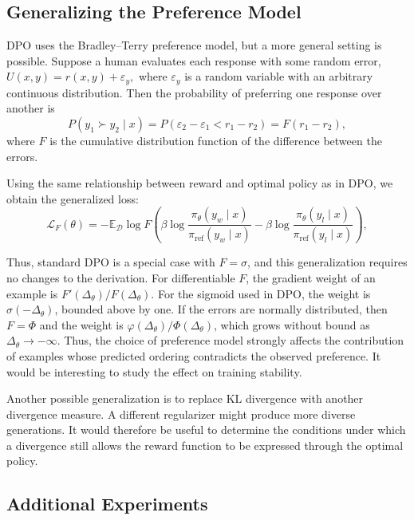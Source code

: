 \documentclass[11pt,a4paper]{article}
\theoremstyle{remark}
\begin{document}
\subsection{Generalizing the Preference Model}

DPO uses the Bradley--Terry preference model, but a more general setting is possible. Suppose a human evaluates each response with some random error, $U(x,y)=r(x,y)+\varepsilon_y,$
where \(\varepsilon_y\) is a random variable with an arbitrary continuous distribution.
Then the probability of preferring one response over another is
\[
P(y_1\succ y_2\mid x)
=P(\varepsilon_2-\varepsilon_1<r_1-r_2)
=F(r_1-r_2),
\]
where \(F\) is the cumulative distribution function of the difference between the errors.

Using the same relationship between reward and optimal policy as in DPO, we obtain the generalized loss:
\[
\mathcal L_F(\theta)
=-\mathbb E_{\mathcal D}\log F(\beta\log\frac{\pi_\theta(y_w\mid x)}
{\pi_{\mathrm{ref}}(y_w\mid x)}
-\beta\log\frac{\pi_\theta(y_l\mid x)}
{\pi_{\mathrm{ref}}(y_l\mid x)}),
\]

Thus, standard DPO is a special case with \(F=\sigma\), and this generalization requires no changes to the derivation. For differentiable \(F\), the gradient weight of an example is \(F'(\Delta_\theta)/F(\Delta_\theta)\). For the sigmoid used in DPO, the weight is $\sigma(-\Delta_\theta)$, bounded above by one. If the errors are normally distributed, then $F=\Phi$ and the weight is $\varphi(\Delta_\theta)/\Phi(\Delta_\theta)$, which grows without bound as $\Delta_\theta\to-\infty$. Thus, the choice of preference model strongly affects the contribution of examples whose predicted ordering contradicts the observed preference. It would be interesting to study the effect on training stability.

Another possible generalization is to replace KL divergence with another divergence measure. A different regularizer might produce more diverse generations. It would therefore be useful to determine the conditions under which a divergence still allows the reward function to be expressed through the optimal policy.

\subsection{Additional Experiments}
\end{document}
